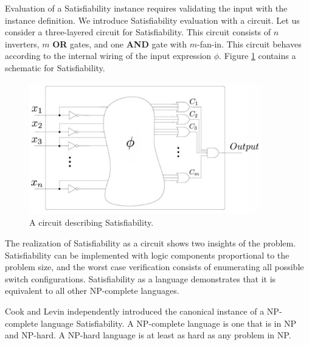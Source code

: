 Evaluation of a {\sc Satisfiability} instance requires validating the input with the instance definition.  We introduce {\sc Satisfiability} evaluation with a circuit.  Let us consider a three-layered circuit for {\sc Satisfiability}.  This circuit consists of $n$ inverters, $m$ \textbf{OR} gates, and one \textbf{AND} gate with $m$-fan-in.  This circuit behaves according to the internal wiring of the input expression $\phi$. Figure \ref{blackBoxSat} contains a schematic for {\sc Satisfiability}.	
\begin{figure}[htbp]
\begin{center}

	\includegraphics[width=0.9\textwidth]{figures/circuitLabeled.jpg}

\caption{A circuit describing {\sc Satisfiability}.}
\label{blackBoxSat}
\end{center}
\end{figure}
	
\FloatBarrier

The realization of {\sc Satisfiability} as a circuit shows two insights of the problem.  {\sc Satisfiability} can be implemented with logic components proportional to the problem size, and the worst case verification consists of enumerating all possible switch configurations.  {\sc Satisfiability} as a language demonstrates that it is equivalent to all other \textsf{NP-complete} languages.

Cook and Levin independently introduced the canonical instance of a \textsf{NP-complete} language {\sc Satisfiability}\cite{Cook:1971:CTP:800157.805047, levin1973}.  A \textsf{NP-complete} language is one that is in \textsf{NP} and \textsf{NP-hard}.  A \textsf{NP-hard} language is at least as hard as any problem in \textsf{NP}.


